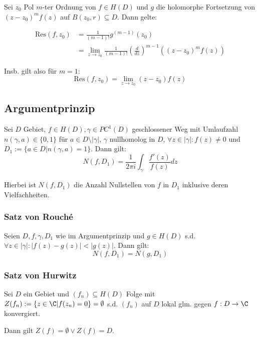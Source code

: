 Sei \(z_0\) Pol \(m\)-ter Ordnung von \(f \in H(D)\) und \(g\) die holomorphe Fortsetzung von \((z-z_0)^m f(z)\) auf \(B(z_0,r) \subseteq D\). Dann gelte:

\vspace*{-4mm}
\begin{align*}
\text{Res}(f,z_0) &= \frac{1}{(m-1)!} g^{(m-1)}(z_0) \\
&= \lim_{z \to z_0} \frac{1}{(m-1)!}\left(\frac{d}{dz}\right)^{m-1} ((z-z_0)^m f(z))
\end{align*}

Insb. gilt also für \(m=1\): \[ \text{Res}(f,z_0) = \lim_{z \to z_0}(z-z_0)f(z) \]

\subsection*{Argumentprinzip}

Sei \(D\) Gebiet, \(f \in H(D), \gamma \in PC^1(D)\) geschlossener Weg mit Umlaufzahl \(n(\gamma,a) \in \{0,1\}\) für \(a \in D \setminus |\gamma|\), \(\gamma\) nullhomolog in \(D\), \(\forall z \in |\gamma| : f(z) \neq 0\) und \(D_1 := \{a \in D | n(\gamma,a)=1\}\). Dann gilt: \[N(f,D_1) = \frac{1}{2\pi i} \int_\gamma \frac{f'(z)}{f(z)} dz\]

Hierbei ist \(N(f,D_1)\) die Anzahl Nullstellen von \(f\) in \(D_1\) inklusive deren Vielfachheiten.

\subsubsection*{Satz von Rouché}

Seien \(D, f, \gamma, D_1\) wie im Argumentprinzip und \(g \in H(D)\) s.d. \(\forall z \in |\gamma| : |f(z) - g(z)| < |g(z)|\). Dann gilt: \[N(f,D_1) = N(g,D_1)\]

\subsubsection*{Satz von Hurwitz}

Sei \(D\) ein Gebiet und \((f_n) \subseteq H(D)\) Folge mit \(Z(f_n) := \{z \in \C | f(z_n)=0\} = \emptyset\) s.d. \((f_n)\) auf \(D\) lokal glm. gegen \(f : D \to \C\) konvergiert.

Dann gilt \(Z(f) = \emptyset \lor Z(f) = D\).
